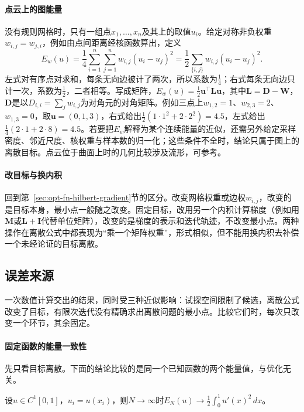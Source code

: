 \paragraph{点云上的图能量}
没有规则网格时，只有一组点$x_1,\dots,x_n$及其上的取值$u_i$。给定对称非负权重$w_{i,j}=w_{j,i}$，例如由点间距离经核函数算出，定义
\begin{equation}
 E_w(u)=\frac14\sum_{i=1}^n\sum_{j=1}^nw_{i,j}(u_i-u_j)^2=\frac12\sum_{\{i,j\}}w_{i,j}(u_i-u_j)^2 .
 \label{eq:opt-fn-graph-energy}
\end{equation}
左式对有序点对求和，每条无向边被计了两次，所以系数为$\frac14$；右式每条无向边只计一次，系数为$\frac12$，二者相等。写成矩阵，$E_w(u)=\frac12\bm u^\top\bm L\bm u$，其中$\bm L=\bm D-\bm W$，$\bm D$是以$D_{i,i}=\sum_jw_{i,j}$为对角元的对角矩阵。例如三点上$w_{1,2}=1$、$w_{2,3}=2$、$w_{1,3}=0$，取$\bm u=(0,1,3)$，右式给出$\frac12(1\cdot1^2+2\cdot2^2)=4.5$，左式给出$\frac14(2\cdot1+2\cdot8)=4.5$。若要把$E_w$解释为某个连续能量的近似，还需另外给定采样密度、邻近尺度、核权重与样本数的归一化；这些条件不全时，结论只属于图上的离散目标。点云位于曲面上时的几何比较涉及流形，可参考。

\paragraph{改目标与换内积}
回到第~\ref{sec:opt-fn-hilbert-gradient}节的区分。改变网格权重或边权$w_{i,j}$，改变的是目标本身，最小点一般随之改变。固定目标，改用另一个内积计算梯度（例如用$\bm M$或$\bm L+\bm I$代替单位矩阵），改变的是梯度的表示和迭代轨迹，不改变最小点。两种操作在离散公式中都表现为“乘一个矩阵权重”，形式相似，但不能用换内积去补偿一个未经论证的目标离散。

\subsection{误差来源}
\label{sec:opt-fn-error-sources}

一次数值计算交出的结果，同时受三种近似影响：试探空间限制了候选，离散公式改变了目标，有限次迭代没有精确求出离散问题的最小点。比较它们时，每次只改变一个环节，其余固定。

\paragraph{固定函数的能量一致性}
先只看目标离散。下面的结论比较的是同一个已知函数的两个能量值，与优化无关。

\begin{theorem}[差分能量的一致性]
\label{thm:opt-fn-energy-consistency}
设$u\in C^1[0,1]$，$u_i=u(x_i)$，则$N\to\infty$时$E_N(u)\to\frac12\int_0^1u'(x)^2\,dx$。
\end{theorem}


